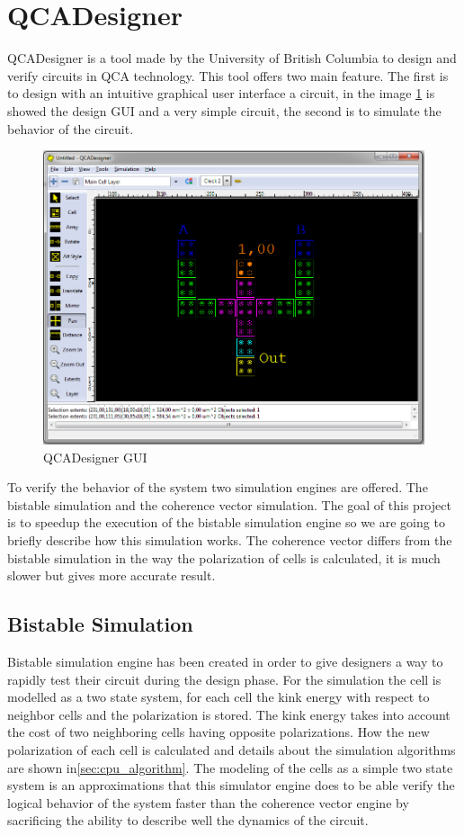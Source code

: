 \section{QCADesigner}
QCADesigner is a tool made by the University of British Columbia to design and verify circuits in QCA technology. This tool offers two main feature. The first is to design with an intuitive graphical user interface a circuit, in the image \ref{img:ambiente} is showed the design GUI and a very simple circuit, the second is to simulate the behavior of the circuit. 

\begin{figure}
\centering
\includegraphics[scale=0.4]{img/QCADesigner.png}
\caption{QCADesigner GUI}
\label{img:ambiente}
\end{figure}
To verify the behavior of the system two simulation engines are offered. The bistable simulation and the coherence vector simulation. The goal of this project is to speedup the execution of the bistable simulation engine so we are going to briefly describe  how this simulation works. The coherence vector differs from the bistable simulation in the way the polarization of cells is calculated, it is much slower but gives more accurate result.

\subsection{Bistable Simulation}
Bistable simulation engine has been created in order to give designers a way to rapidly test their circuit during the design phase. For the simulation the cell is modelled as a two state system, for each cell the kink energy with respect to neighbor cells and the polarization is stored. The kink energy takes into account the cost of two neighboring cells having opposite polarizations. How the new polarization of each cell is calculated and details about the simulation algorithms are shown in\ref{sec:cpu_algorithm}. The modeling of the cells as a simple two state system is an approximations that this simulator engine does to be able verify the logical behavior of the system faster than the coherence vector engine by sacrificing the ability to describe well the dynamics of the circuit. 

